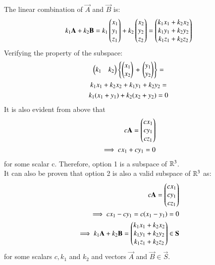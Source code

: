 \documentclass[journal,12pt,twocolumn]{IEEEtran}
\begin{document}
The linear combination of $\vec{A}$ and $\vec{B}$ is:
\begin{align}
  k_1\mathbf{A} + k_2\mathbf{B} = k_1\begin{pmatrix}x_1 \\ y_1 \\ z_1\end{pmatrix} + k_2\begin{pmatrix}x_2 \\ y_2 \\ z_2\end{pmatrix} = \begin{pmatrix}k_1x_1 + k_2x_2 \\ k_1y_1 + k_2y_2 \\ k_1z_1 + k_2z_2\end{pmatrix}
\end{align}
Verifying the property of the subspace:
\begin{multline}
   \begin{pmatrix}k_1 & k_2\end{pmatrix}\left\{\begin{pmatrix}x_1 \\ x_2\end{pmatrix}\right. + \left.\begin{pmatrix}y_1 \\ y_2\end{pmatrix}\right\} = \\
   k_1x_1+k_2x_2+k_1y_1+k_2y_2 = \\
  k_1(x_1+y_1)+k_2(x_2+ y_2) = 0
\end{multline}
It is also evident from above that
\begin{align}
  c\mathbf{A} = \begin{pmatrix}cx_1 \\ cy_1 \\ cz_1\end{pmatrix} \\
  \implies cx_1 + cy_1 = 0
\end{align}
for some scalar c. Therefore, option 1 is a subspace of $\mathbb{R}^3$. \\
It can also be proven that option 2 is also a valid subspace of $\mathbb{R}^3$ as:
\begin{align}
  c\mathbf{A} = \begin{pmatrix}cx_1 \\ cy_1 \\ cz_1\end{pmatrix} \\
  \implies cx_1 - cy_1 = c(x_1 - y_1) = 0 \\
  \implies   k_1\mathbf{A} + k_2\mathbf{B} = \begin{pmatrix}k_1x_1 + k_2x_2 \\ k_1y_1 + k_2y_2 \\ k_1z_1 + k_2z_2\end{pmatrix} \in \mathbf{S}
\end{align} for some scalars $c, k_1$ and $k_2$ and vectors $\vec{A}$ and $\vec{B} \in \vec{S}$.
\end{document}
